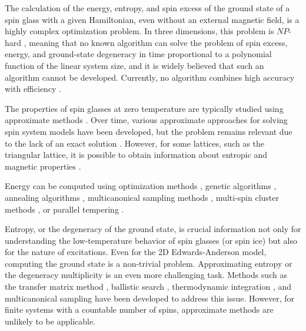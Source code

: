 \documentclass[utf8, babel, sor, jor, amsmath, amssymb, reprint]{elsarticle} %
\begin{document}
The calculation of the energy, entropy, and spin excess of the ground state of a spin glass with a given Hamiltonian, even without an external magnetic field, is a highly complex optimization problem. In three dimensions, this problem is $NP$-hard \cite{barahona1982computational, hartmann2002optimization}, meaning that no known algorithm can solve the problem of spin excess, energy, and ground-state degeneracy in time proportional to a polynomial function of the linear system size, and it is widely believed that such an algorithm cannot be developed. Currently, no algorithm combines high accuracy with efficiency \cite{fan2023searching}.

The properties of spin glasses at zero temperature are typically studied using approximate methods \cite{roma2009ground, perez2012ground}. Over time, various approximate approaches for solving spin system models have been developed, but the problem remains relevant due to the lack of an exact solution \cite{rybin2022hybrid, makarova2023canonical, farias2024differentiable}. However, for some lattices, such as the triangular lattice, it is possible to obtain information about entropic and magnetic properties \cite{jurvcivsinova2024classical}.

Energy can be computed using optimization methods \cite{hartmann2002optimization, hartmann2004new}, genetic algorithms \cite{holland1992adaptation}, annealing algorithms \cite{kirkpatrick1983optimization}, multicanonical sampling methods \cite{berg1994ground, shevchenko2017multicanonical}, multi-spin cluster methods \cite{makarova2023canonical}, or parallel tempering \cite{PhysRevB.50.16444, roma2009ground}.

Entropy, or the degeneracy of the ground state, is crucial information not only for understanding the low-temperature behavior of spin glasses (or spin ice) but also for the nature of excitations. Even for the 2D Edwards-Anderson model, computing the ground state is a non-trivial problem. Approximating entropy or the degeneracy multiplicity is an even more challenging task. Methods such as the transfer matrix method \cite{PhysRevB.22.288, cheung1983equilibrium, kolan1982ground}, ballistic search \cite{hartmann2000ground}, thermodynamic integration \cite{kirkpatrick1977frustration, binder1985monte, roma2004ground}, and multicanonical sampling \cite{berg1994ground, shevchenko2017multicanonical} have been developed to address this issue. However, for finite systems with a countable number of spins, approximate methods are unlikely to be applicable.  
\end{document}
